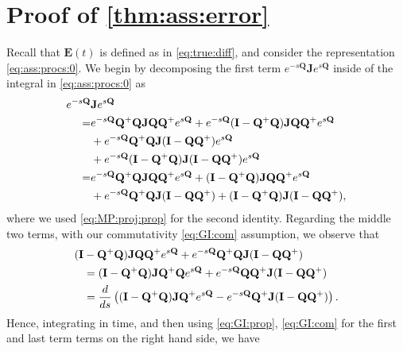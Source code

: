 \documentclass[9pt,twocolumn,twoside]{pnas-new}
\newcommand{\?}{\textbf{?}}
\newcommand{\QQ}{\mathbf{Q}}
\newcommand{\JJ}{\mathbf{J}}
\newcommand{\II}{\mathbf{I}}
\newcommand{\Z}{\mathbf{E}}
\begin{document}
\newpage



\appendix  


\section{Proof of \cref{thm:ass:error}}
\label{sec:Thm:det:main}


Recall that $\Z(t)$ is defined as in \eqref{eq:true:diff}, and
consider the representation \eqref{eq:ass:procs:0}. We begin by
decomposing the first term $e^{-s\QQ} \JJ e^{s \QQ}$ inside of the
integral in \eqref{eq:ass:procs:0} as
\begin{align}
  e^{-s\QQ} &\JJ e^{s \QQ} \notag\\
  =&e^{-s\QQ} \QQ^+ \QQ \JJ \QQ \QQ^{+} e^{s\QQ}
     + e^{-s\QQ} (\II -\QQ^+ \QQ) \JJ \QQ \QQ^{+} e^{s\QQ}
                  \notag\\
      &+ e^{-s\QQ}\QQ^+ \QQ \JJ (\II - \QQ \QQ^{+}) e^{s\QQ}
                \notag\\
       &+e^{-s\QQ} (\II -\QQ^+ \QQ) \JJ (\II -\QQ \QQ^{+}) e^{s\QQ}
                           \notag\\
  = &e^{-s\QQ} \QQ^+ \QQ \JJ \QQ \QQ^{+} e^{s\QQ}
      + (\II -\QQ^+ \QQ) \JJ \QQ \QQ^{+} e^{s\QQ}
         \label{eq:big:yuck:1}                          
      \\
      &+ e^{-s\QQ}\QQ^+ \QQ \JJ (\II - \QQ \QQ^{+})
  + (\II -\QQ^+ \QQ) \JJ (\II -\QQ \QQ^{+}),
  \notag
\end{align}
where we used \eqref{eq:MP:proj:prop} for the second identity.
Regarding the middle two terms, with our commutativity
\eqref{eq:GI:com} assumption, we observe that
\begin{align}
  (\II &-\QQ^+ \QQ) \JJ \QQ \QQ^{+} e^{s\QQ}
         + e^{-s\QQ}\QQ^+ \QQ \JJ (\II - \QQ \QQ^{+})
                \label{eq:big:yuck:2}                          
                     \\
  &=  (\II -\QQ^+ \QQ) \JJ \QQ^{+} \QQ e^{s\QQ}
    + e^{-s\QQ}\QQ \QQ^+ \JJ (\II - \QQ \QQ^{+})
    \notag\\
  &= \frac{d}{ds}
    \left(
    (\II -\QQ^+ \QQ) \JJ \QQ^{+} e^{s\QQ}
    - e^{-s\QQ} \QQ^+ \JJ (\II - \QQ \QQ^{+})
    \right).
 \notag
\end{align}
Hence, integrating in time, and then using \eqref{eq:GI:prop},
\eqref{eq:GI:com} for the first and last term terms on the right hand side, we have
\end{document}

